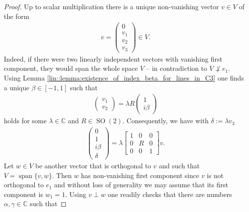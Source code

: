 \documentclass{amsart}
\newcommand{\C}{\mathbb{C}}
\DeclareMathOperator{\SO}{SO}
\DeclareMathOperator{\spann}{span}
\begin{document}
\begin{proof}
    Up to scalar multiplication there is a unique non-vanishing vector $v \in V$ of the form
    \begin{align*}
        v = \begin{pmatrix}
            0 \\ v_1 \\ v_2 \\ v_3
        \end{pmatrix} \in V.
    \end{align*}
    Indeed, if there were two linearly independent vectors with vanishing first component, they would span the whole space $V$ -- in contradiction to $V \not \perp e_1$. Using Lemma \ref{lin::lemma:existence_of_index_beta_for_lines_in_C3} one finds a unique $\beta \in [-1,1]$ such that
    \begin{align*}
        \begin{pmatrix}
            v_1 \\ v_2
        \end{pmatrix}
        = 
        \lambda R \begin{pmatrix}
                1 \\ i \beta
        \end{pmatrix}
    \end{align*}
    holds for some $\lambda \in \C$ and $R \in \SO(2)$. Consequently, we have with $\delta := \lambda v_3$
    \begin{align*}
        \begin{pmatrix}
                0 \\ 1 \\ i \beta \\ \delta
            \end{pmatrix}
        = 
        \lambda \left[\begin{array}{c|c|c}
            1& 0 & 0 \\
            \hline
            0 & R & 0 \\
            \hline 
            0 & 0 & 1
            \end{array}\right]
            v.
    \end{align*}
    Let $w \in V$ be another vector that is orthogonal to $v$ and such that $V = \spann \{ v, w\}$. Then $w$ has non-vanishing first component since $v$ is not orthogonal to $e_1$ and without loss of generality we may assume that its first component is $w_1 = 1$. Using $v \perp w$ one readily checks that there are numbers $\alpha, \gamma \in \C$ such that

\end{proof}
\end{document}
